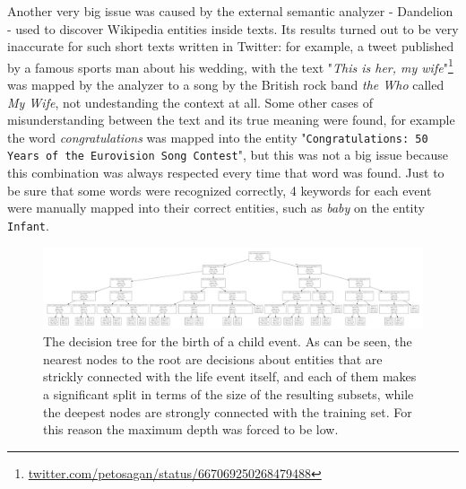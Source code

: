 Another very big issue was caused by the external semantic analyzer - Dandelion - used to discover Wikipedia entities inside texts. Its results turned out to be very inaccurate for such short texts written in Twitter: for example, a tweet published by a famous sports man about his wedding, with the text "\textit{This is her, my wife}"\footnote{\url{twitter.com/petosagan/status/667069250268479488}} was mapped by the analyzer to a song by the British rock band \textit{the Who} called \textit{My Wife}, not undestanding the context at all. Some other cases of misunderstanding between the text and its true meaning were found, for example the word \textit{congratulations} was mapped into the entity "\texttt{Congratulations: 50 Years of the Eurovision Song Contest}", but this was not a big issue because this combination was always respected every time that word was found. Just to be sure that some words were recognized correctly, 4 keywords for each event were manually mapped into their correct entities, such as \textit{baby} on the entity \texttt{Infant}.

\begin{figure}
\centering
\includegraphics[width=%
1\textwidth]{img/decisiontree}
\caption{The decision tree for the birth of a child event. As can be seen, the nearest nodes to the root are decisions about entities that are strickly connected with the life event itself, and each of them makes a significant split in terms of the size of the resulting subsets, while the deepest nodes are strongly connected with the training set. For this reason the maximum depth was forced to be low.}
\label{fig:decisiontree}
\end{figure}

